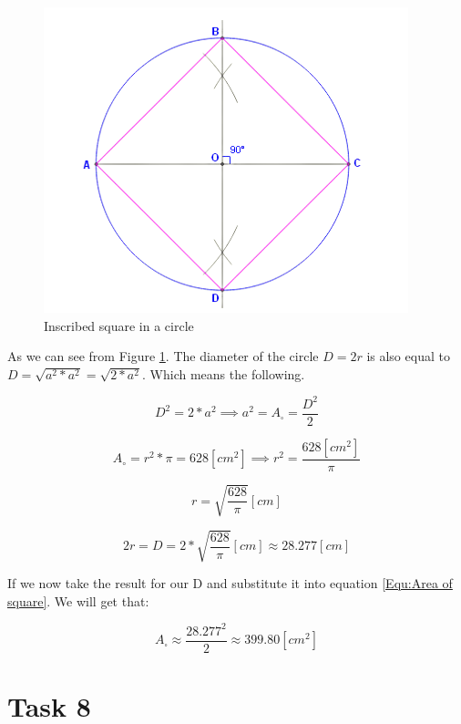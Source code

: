 \documentclass[a4paper, 10pt]{article}
\begin{document}
		\begin{figure}[h]
			\centering
			\includegraphics[scale = .85]{inscribedSquare}
			\caption{Inscribed square in a circle}
			\label{fig:InscribedSquare}
		\end{figure}
	
		\noindent As we can see from Figure \ref{fig:InscribedSquare}. The diameter of the circle $D = 2r$ is also equal to $D = \sqrt{a^2 * a^2} = \sqrt{2*a^2}$. Which means the following.
		
		\begin{equation}
			D^2 = 2*a^2 \implies a^2 = A_\square = \frac{D^2}{2}
			\label{Equ:Area of square}
		\end{equation}

		\begin{equation}
			A_\circ = r^2 * \pi = 628 [cm^2] \implies r^2 = \frac{628 [cm^2]}{\pi}
		\end{equation}
	
		\begin{equation*}
			r = \sqrt{\frac{628}{\pi}} [cm]
		\end{equation*}
	
		\begin{equation*}
			2r = D = 2 * \sqrt{\frac{628}{\pi}} [cm] \approx 28.277 [cm]
		\end{equation*}
	
		\noindent If we now take the result for our D and substitute it into equation \ref{Equ:Area of square}. We will get that:
		
		\begin{equation*}
			A_\square \approx \frac{28.277^2}{2} \approx 399.80 [cm^2]
		\end{equation*}
	\section{Task 8}
	
\end{document}
